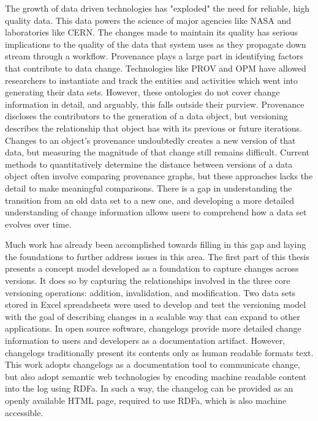 

The growth of data driven technologies has "exploded" the need for reliable, high quality data.
This data powers the science of major agencies like NASA and laboratories like CERN.
The changes made to maintain its quality has serious implications to the quality of the data that system uses as they propagate down stream through a workflow.
Provenance plays a large part in identifying factors that contribute to data change.
Technologies like PROV and OPM have allowed researchers to instantiate and track the entities and activities which went into generating their data sets.
However, these ontologies do not cover change information in detail, and arguably, this falls outside their purview.
Provenance discloses the contributors to the generation of a data object, but versioning describes the relationship that object has with its previous or future iterations.
Changes to an object's provenance undoubtedly creates a new version of that data, but measuring the magnitude of that change still remains difficult.
Current methods to quantitatively determine the distance between versions of a data object often involve comparing provenance graphs, but these approaches lacks the detail to make meaningful comparisons.
There is a gap in understanding the transition from an old data set to a new one, and developing a more detailed understanding of change information allows users to comprehend how a data set evolves over time.

Much work has already been accomplished towards filling in this gap and laying the foundations to further address issues in this area.
The first part of this thesis presents a concept model developed as a foundation to capture changes across versions.
It does so by capturing the relationships involved in the three core versioning operations: addition, invalidation, and modification.
Two data sets stored in Excel spreadsheets were used to develop and test the versioning model with the goal of describing changes in a scalable way that can expand to other applications.
In open source software, changelogs provide more detailed change information to users and developers as a documentation artifact.
However, changelogs traditionally present its contents only as human readable formats text.
This work adopts changelogs as a documentation tool to communicate change, but also adopt semantic web technologies by encoding machine readable content into the log using RDFa.
In such a way, the changelog can be provided as an openly available HTML page, required to use RDFa, which is also machine accessible.

